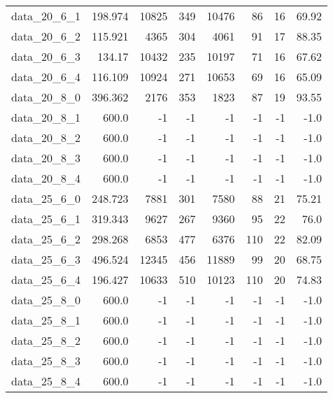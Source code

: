 \begin{tabular}{rrrrrrrr}
  data\_20\_6\_1 & 198.974 & 10825 & 349 & 10476 & 86 & 16 & 69.92 \\
  data\_20\_6\_2 & 115.921 & 4365 & 304 & 4061 & 91 & 17 & 88.35 \\
  data\_20\_6\_3 & 134.17 & 10432 & 235 & 10197 & 71 & 16 & 67.62 \\
  data\_20\_6\_4 & 116.109 & 10924 & 271 & 10653 & 69 & 16 & 65.09 \\
  data\_20\_8\_0 & 396.362 & 2176 & 353 & 1823 & 87 & 19 & 93.55 \\
  data\_20\_8\_1 & 600.0 & -1 & -1 & -1 & -1 & -1 & -1.0 \\
  data\_20\_8\_2 & 600.0 & -1 & -1 & -1 & -1 & -1 & -1.0 \\
  data\_20\_8\_3 & 600.0 & -1 & -1 & -1 & -1 & -1 & -1.0 \\
  data\_20\_8\_4 & 600.0 & -1 & -1 & -1 & -1 & -1 & -1.0 \\
  data\_25\_6\_0 & 248.723 & 7881 & 301 & 7580 & 88 & 21 & 75.21 \\
  data\_25\_6\_1 & 319.343 & 9627 & 267 & 9360 & 95 & 22 & 76.0 \\
  data\_25\_6\_2 & 298.268 & 6853 & 477 & 6376 & 110 & 22 & 82.09 \\
  data\_25\_6\_3 & 496.524 & 12345 & 456 & 11889 & 99 & 20 & 68.75 \\
  data\_25\_6\_4 & 196.427 & 10633 & 510 & 10123 & 110 & 20 & 74.83 \\
  data\_25\_8\_0 & 600.0 & -1 & -1 & -1 & -1 & -1 & -1.0 \\
  data\_25\_8\_1 & 600.0 & -1 & -1 & -1 & -1 & -1 & -1.0 \\
  data\_25\_8\_2 & 600.0 & -1 & -1 & -1 & -1 & -1 & -1.0 \\
  data\_25\_8\_3 & 600.0 & -1 & -1 & -1 & -1 & -1 & -1.0 \\
  data\_25\_8\_4 & 600.0 & -1 & -1 & -1 & -1 & -1 & -1.0 \\
  \hline
\end{tabular}
